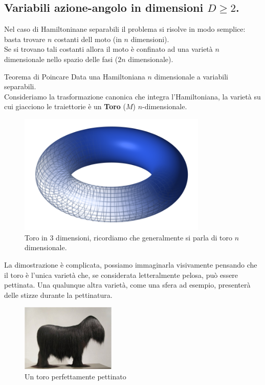 \subsection{Variabili azione-angolo in dimensioni $D\ge 2$.}%
\label{sub:Variabili azione angolo in dimensioni >2.}
Nel caso di Hamiltoninane separabili il problema si risolve in modo semplice: basta trovare $n$ costanti dell moto (in $n$ dimensioni).\\
Se si trovano tali costanti allora il moto è confinato ad una varietà $n$ dimensionale nello spazio delle fasi ($2n$ dimensionale).
\begin{redbox}{Teorema di Poincare}
    Data una Hamiltoniana $n$ dimensionale a variabili separabili.\\
    Consideriamo la trasformazione canonica che integra l'Hamiltoniana, la varietà su cui giacciono le traiettorie è un \textbf{Toro} ($M$) $n$-dimensionale.
\begin{figure}[H]
    \centering
    \includegraphics[width=0.8\textwidth]{figures/lez_16_Torus_low_quality.png}
    \caption{\scriptsize Toro in 3 dimensioni, ricordiamo che generalmente si parla di toro $n$ dimensionale.}
    \label{fig:figures-lez_16_Torus_low_quality-png}
\end{figure}
\noindent
\end{redbox}
\noindent
La dimostrazione è complicata, possiamo immaginarla visivamente pensando che il toro è l'unica varietà che, se considerata letteralmente pelosa, può essere pettinata. Una qualunque altra varietà, come una sfera ad esempio, presenterà delle stizze durante la pettinatura.
\begin{figure}[H]
    \centering
    \includegraphics[width=0.4\textwidth]{figures/lez_15_toro_peloso.jpg}
    \caption{\scriptsize Un toro perfettamente pettinato}
    \label{fig:figures-lez_15_toro_peloso-jpg}
\end{figure}
